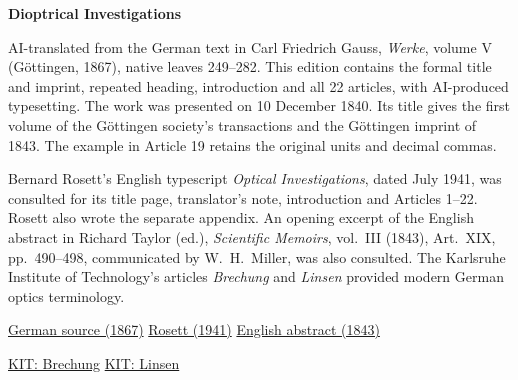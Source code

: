 \clearpage
\thispagestyle{empty}
\begin{center}\Large\textbf{Dioptrical Investigations}\end{center}

AI-translated from the German text in Carl Friedrich Gauss, \textit{Werke}, volume V (Göttingen, 1867), native leaves 249--282. This edition contains the formal title and imprint, repeated heading, introduction and all 22 articles, with AI-produced typesetting. The work was presented on 10 December 1840. Its title gives the first volume of the Göttingen society's transactions and the Göttingen imprint of 1843. The example in Article 19 retains the original units and decimal commas.

Bernard Rosett's English typescript \textit{Optical Investigations}, dated July 1941, was consulted for its title page, translator's note, introduction and Articles 1--22. Rosett also wrote the separate appendix. An opening excerpt of the English abstract in Richard Taylor (ed.), \textit{Scientific Memoirs}, vol.~III (1843), Art.~XIX, pp.~490--498, communicated by W.~H.~Miller, was also consulted. The Karlsruhe Institute of Technology's articles \textit{Brechung} and \textit{Linsen} provided modern German optics terminology.

\noindent\href{https://gdz.sub.uni-goettingen.de/id/PPN236006339}{German source (1867)}\quad
\href{https://wp.optics.arizona.edu/jsasian/wp-content/uploads/sites/33/2016/02/Gauss.pdf}{Rosett (1941)}\quad
\href{https://archive.org/details/scientificmemoir03memo/page/490/mode/1up}{English abstract (1843)}\quad
\par\smallskip\noindent\href{https://labs.physik.kit.edu/prakt-klass-physik-manuals/P1/Geometrische_Optik/doc/Hinweise-Brechung/}{KIT: Brechung}\quad
\href{https://labs.physik.kit.edu/prakt-klass-physik-manuals/P1/Geometrische_Optik/doc/Hinweise-Linsen/}{KIT: Linsen}
\clearpage
